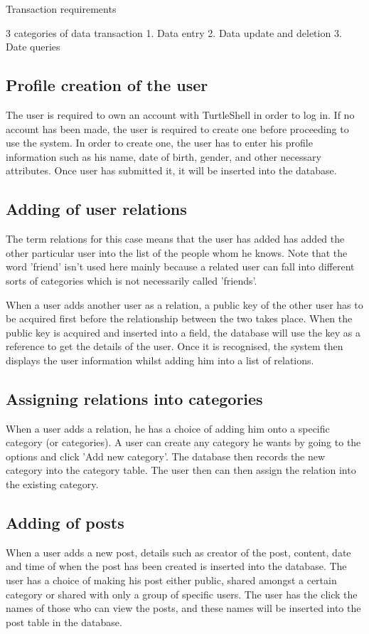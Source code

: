 Transaction requirements

3 categories of data transaction
1. Data entry
2. Data update and deletion
3. Date queries

\subsection{Profile creation of the user}
The user is required to own an account with TurtleShell in order to log in. If
no account has been made, the user is required to create one before proceeding
to use the system. In order to create one, the user has to enter his profile
information such as his name, date of birth, gender, and other necessary
attributes. Once user has submitted it, it will be inserted into the database.

\subsection{Adding of user relations}
The term relations for this case means that the user has added has added the
other particular user into the list of the people whom he knows. Note that the
word 'friend' isn't used here mainly because a related user can fall into
different sorts of categories which is not necessarily called 'friends'.

When a user adds another user as a relation, a public key of the other user has
to be acquired first before the relationship between the two takes place. When
the public key is acquired and inserted into a field, the database will use the
key as a reference to get the details of the user. Once it is recognised, the
system then displays the user information whilst adding him into a list of
relations.

\subsection{Assigning relations into categories}
When a user adds a relation, he has a choice of adding him onto a specific
category (or categories). A user can create any category he wants by going to
the options and click 'Add new category'. The database then records the new
category into the category table.  The user then can then assign the relation
into the existing category. 

\subsection{Adding of posts}
When a user adds a new post, details such as creator of the post, content, date
and time of when the post has been created is inserted into the database. The
user has a choice of making his post either public, shared amongst a certain
category or shared with only a group of specific users. The user has the click
the names of those who can view the posts, and these names will be inserted into
the post table in the database.


